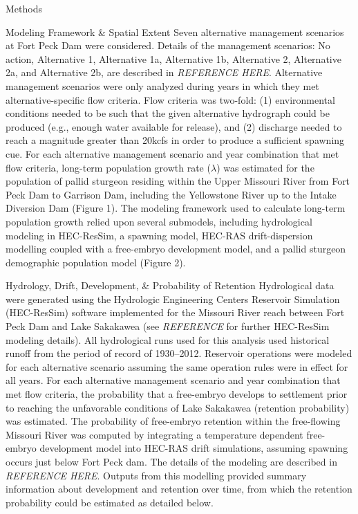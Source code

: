 \documentclass[12pt]{article}
\begin{document}
\begin{section}{Methods}
\begin{subsection}{Modeling Framework \& Spatial Extent}
Seven alternative management scenarios at Fort Peck Dam were considered.   Details of the management scenarios:  No action, Alternative 1, Alternative 1a, Alternative 1b, Alternative 2, Alternative 2a, and Alternative 2b, are described in \textit{REFERENCE HERE}.  Alternative management scenarios were only analyzed during years in which they met alternative-specific flow criteria.  Flow criteria was two-fold: (1) environmental conditions needed to be such that the given alternative hydrograph could be produced (e.g., enough water available for release), and (2) discharge needed to reach a magnitude greater than 20kcfs in order to produce a sufficient spawning cue. For each alternative management scenario and year combination that met flow criteria, long-term population growth rate ($\lambda$) was estimated for the population of pallid sturgeon residing within the Upper Missouri River from Fort Peck Dam to Garrison Dam, including the Yellowstone River up to the Intake Diversion Dam (Figure 1).  The modeling framework used to calculate long-term population growth relied upon several submodels, including hydrological modeling in HEC-ResSim, a spawning model, HEC-RAS drift-dispersion modelling coupled with a free-embryo development model, and a pallid sturgeon demographic population model (Figure 2).  

\begin{subsubsection}{Hydrology, Drift, Development, \& Probability of Retention}
Hydrological data were generated using the Hydrologic Engineering Centers Reservoir Simulation (HEC-ResSim) software implemented for the Missouri River reach between Fort Peck Dam and Lake Sakakawea (see \textit{REFERENCE} for further HEC-ResSim modeling details).  All hydrological runs used for this analysis used historical runoff from the period of record of 1930--2012.  Reservoir operations were modeled for each alternative scenario assuming the same operation rules were in effect for all years.    For each alternative management scenario and year combination that met flow criteria, the probability that a free-embryo develops to settlement prior to reaching the unfavorable conditions of Lake Sakakawea (retention probability) was estimated. The probability of free-embryo retention within the free-flowing Missouri River was computed by integrating a temperature dependent free-embryo development model into HEC-RAS drift simulations, assuming spawning occurs just below Fort Peck dam.  The details of the modeling are described in \textit{REFERENCE HERE}.  Outputs from this modelling provided summary information about development and retention over time, from which the retention probability could be estimated as detailed below.\\


\end{subsubsection}
\end{subsection}
\end{section}
\end{document}
